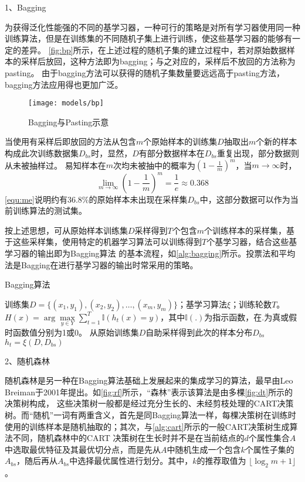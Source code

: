 1、Bagging

为获得泛化性能强的不同的基学习器，一种可行的策略是对所有学习器使用同一种训练算法，但是在训练集的不同随机子集上进行训练，使这些基学习器的能够有一定的差异。
\autoref{fig:bp}所示，在上述过程的随机子集的建立过程中，若对原始数据样本的采样后放回，这种方法即为bagging；与之对应的，采样后不放回的方法称为pasting\cite{Aurélien2018,Zhou2016}。
由于bagging方法可以获得的随机子集数量要远远高于pasting方法，bagging方法应用得也更加广泛。
\begin{figure}[htbp]
    \centering
    \texttt{[image: models/bp]}
    \caption[Bagging与Pasting示意]{\label{fig:bp}Bagging与Pasting示意\cite{Aurélien2018}}
\end{figure}

当使用有采样后即放回的方法从包含$m$个原始样本的训练集$D$抽取出$m$个新的样本构成此次训练数据集$D_{bs}$时，显然，$D$有部分数据样本在$D_{bs}$重复出现，部分数据则从未被抽样过。
易知样本在$m$次均未被抽中的概率为$(1-\frac{1}{m})^m$，当$m \to \infty$时，
\begin{equation}
    \label{equ:me}
    \lim_{m \to \infty}{(1-\frac{1}{m})}^m = \frac{1}{e} \approx 0.368
\end{equation}
\autoref{equ:me}说明约有36.8\%的原始样本未出现在采样集$D_{bs}$中，这部分数据可以作为当前训练算法的测试集。

按上述思想，可从原始样本训练集$D$采样得到$T$个包含$m$个训练样本的采样集，基于这些采样集，使用特定的机器学习算法可以训练得到$T$个基学习器，结合这些基学习器的输出即为Bagging算法
的基本流程，如\autoref{alg:bagging}所示。投票法和平均法是Bagging在进行基学习器的输出时常采用的策略。
\begin{breakablealgorithm}
    \caption[Bagging算法]{Bagging算法\cite{Zhou2016}}
    \label{alg:bagging}
    \begin{algorithmic}[1] %
        \Require 训练集$D=\{(x_1,y_1),(x_2,y_2),\dots,(x_m,y_m)\}$；基学习算法$\xi$；训练轮数$T$。
        \Ensure $H(x)=\arg \max \limits_{y \in Y} \sum_{t=1}^T \mathbb{I}(h_t(x)=y)$，其中$\mathbb{I}(.)$为指示函数，在$.$为真或假时函数值分别为1或0。
            \State 从原始训练集$D$自助采样得到此次的样本分布$D_{bs}$
            \State $h_t=\xi (D,D_{bs})$
        \EndFor
    \end{algorithmic}
\end{breakablealgorithm}

2、随机森林

随机森林是另一种在Bagging算法基础上发展起来的集成学习的算法，最早由Leo Breiman于2001年提出\cite{breiman2001}。如\autoref{fig:rf}所示，“森林”表示该算法是由多棵\autoref{fig:dt}所示的决策树构成，
这些决策树一般都是经过充分生长的、未经剪枝处理的CART决策树。而“随机”一词有两重含义，首先是同Bagging算法一样，每棵决策树在训练时使用的训练样本是随机抽取的；其次，与\autoref{alg:cart}所示的一般CART决策树生成算法不同，随机森林中的CART
决策树在生长时并不是在当前结点的$d$个属性集合$A$中选取最优特征及其最优切分点，而是先从$A$中随机生成一个包含$k$个属性子集的$A_{bs}$，随后再从$A_{bs}$中选择最优属性进行划分\cite{Zhou2016,Liu2018,breiman2001}。其中，$k$的推荐取值为
$\lfloor \log_2m + 1 \rfloor$\cite{breiman2001}。

